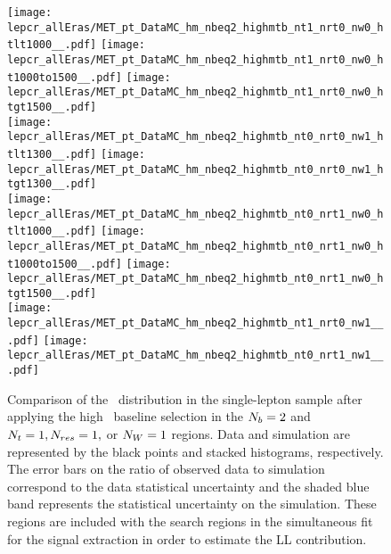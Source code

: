 \begin{figure}[!htb]
	\begin{center}
  \texttt{[image: lepcr\_allEras/MET\_pt\_DataMC\_hm\_nbeq2\_highmtb\_nt1\_nrt0\_nw0\_htlt1000\_\_.pdf]}
  \texttt{[image: lepcr\_allEras/MET\_pt\_DataMC\_hm\_nbeq2\_highmtb\_nt1\_nrt0\_nw0\_ht1000to1500\_\_.pdf]}
  \texttt{[image: lepcr\_allEras/MET\_pt\_DataMC\_hm\_nbeq2\_highmtb\_nt1\_nrt0\_nw0\_htgt1500\_\_.pdf]} \\
  \texttt{[image: lepcr\_allEras/MET\_pt\_DataMC\_hm\_nbeq2\_highmtb\_nt0\_nrt0\_nw1\_htlt1300\_\_.pdf]} 
  \texttt{[image: lepcr\_allEras/MET\_pt\_DataMC\_hm\_nbeq2\_highmtb\_nt0\_nrt0\_nw1\_htgt1300\_\_.pdf]} \\
  \texttt{[image: lepcr\_allEras/MET\_pt\_DataMC\_hm\_nbeq2\_highmtb\_nt0\_nrt1\_nw0\_htlt1000\_\_.pdf]} 
  \texttt{[image: lepcr\_allEras/MET\_pt\_DataMC\_hm\_nbeq2\_highmtb\_nt0\_nrt1\_nw0\_ht1000to1500\_\_.pdf]} 
  \texttt{[image: lepcr\_allEras/MET\_pt\_DataMC\_hm\_nbeq2\_highmtb\_nt0\_nrt1\_nw0\_htgt1500\_\_.pdf]} \\
  \texttt{[image: lepcr\_allEras/MET\_pt\_DataMC\_hm\_nbeq2\_highmtb\_nt1\_nrt0\_nw1\_\_.pdf]} 
  \texttt{[image: lepcr\_allEras/MET\_pt\_DataMC\_hm\_nbeq2\_highmtb\_nt0\_nrt1\_nw1\_\_.pdf]} \\
	\end{center}
	\caption[Lost Lepton HM Control Region $\nb=2$ with 1 heavy object]{Comparison of the \met~distribution in the single-lepton sample after applying the high \dm~baseline selection in the $\nb=2$ and $N_{t}=1, N_{res}=1,$ or $N_{W}=1$ regions. Data and simulation are represented by the black points and stacked histograms, respectively. The error bars on the ratio of observed data to simulation correspond to the data statistical uncertainty and the shaded blue band represents the statistical uncertainty on the simulation. These regions are included with the search regions in the simultaneous fit for the signal extraction in order to estimate the LL contribution.
	 }
	\label{fig:llb-1lcr-datavsmc-hm-nb2-1}
\end{figure}

